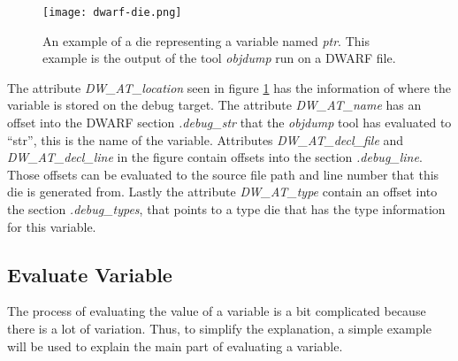 \begin{figure}[h]
	\centering
	\texttt{[image: dwarf-die.png]}
	\caption{An example of a \gls{die} representing a variable named \emph{ptr}. This example is the output of the tool \emph{objdump} run on a \gls{DWARF} file.}
	\label{fig:dwarfdie}
\end{figure}


The attribute \emph{DW\_AT\_location} seen in figure \ref{fig:dwarfdie} has the information of where the variable is stored on the debug target.
The attribute \emph{DW\_AT\_name} has an offset into the \gls{DWARF} section \emph{.debug\_str} that the \emph{objdump} tool has evaluated to ``str'', this is the name of the variable.
Attributes \emph{DW\_AT\_decl\_file} and \emph{DW\_AT\_decl\_line} in the figure contain  offsets into the section \emph{.debug\_line}.
Those offsets can be evaluated to the source file path and line number that this \gls{die} is generated from.
Lastly the attribute \emph{DW\_AT\_type} contain an offset into the section \emph{.debug\_types}, that points to a type \gls{die} that has the type information for this variable.



\subsection{Evaluate Variable}
\label{sec:evaluate-variable}
 


The process of evaluating the value of a variable is a bit complicated because there is a lot of variation.
Thus, to simplify the explanation, a simple example will be used to explain the main part of evaluating a variable.


